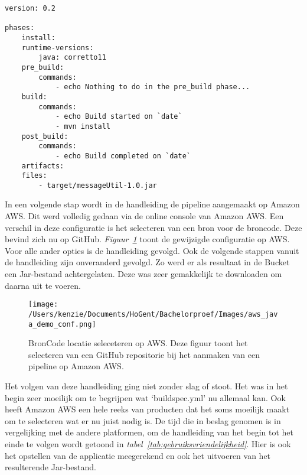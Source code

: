 \begin{lstlisting}
version: 0.2

phases:
    install:
    runtime-versions:
        java: corretto11
    pre_build:
        commands:
            - echo Nothing to do in the pre_build phase...
    build:
        commands:
            - echo Build started on `date`
            - mvn install
    post_build:
        commands:
            - echo Build completed on `date`
    artifacts:
    files:
        - target/messageUtil-1.0.jar
\end{lstlisting}

In een volgende stap wordt in de handleiding de pipeline aangemaakt op Amazon AWS. Dit werd volledig gedaan via de online console van Amazon AWS. Een verschil in deze configuratie is het selecteren van een bron voor de broncode. Deze bevind zich nu op GitHub. \emph{Figuur~\ref{fig:aws_java_demo_conf}} toont de gewijzigde configuratie op AWS. Voor alle ander opties is de handleiding gevolgd. Ook de volgende stappen vanuit de handleiding zijn onveranderd gevolgd. Zo werd er als resultaat in de Bucket een Jar-bestand achtergelaten. Deze was zeer gemakkelijk te downloaden om daarna uit te voeren.

\begin{figure}[!htbp]
    \centering
    \texttt{[image: /Users/kenzie/Documents/HoGent/Bachelorproef/Images/aws\_java\_demo\_conf.png]}
    \caption{BronCode locatie seleceteren op AWS. Deze figuur toont het selecteren van een GitHub repositorie bij het aanmaken van een pipeline op Amazon AWS.}
    \label{fig:aws_java_demo_conf}
\end{figure}

Het volgen van deze handleiding ging niet zonder slag of stoot. Het was in het begin zeer moeilijk om te begrijpen wat ‘buildspec.yml’ nu allemaal kan. Ook heeft Amazon AWS een hele reeks van producten dat het soms moeilijk maakt om te selecteren wat er nu juist nodig is. De tijd die in beslag genomen is in vergelijking met de andere platformen, om de handleiding van het begin tot het einde te volgen wordt getoond in \emph{tabel~\ref{tab:gebruiksvriendelijkheid}}. Hier is ook het opstellen van de applicatie meegerekend en ook het uitvoeren van het resulterende Jar-bestand.


